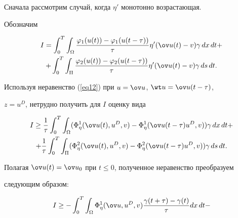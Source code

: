 \begin{pf}


Сначала рассмотрим случай, когда ${\eta}'$ монотонно возрастающая.


Обозначим 


\begin{multline*}


I=\int_{0}^{T} \int_{\Omega} \frac{\varphi_{1}(u(t))


- \varphi_{1}(u(t-\tau))}


{\tau}{\eta}' (\ov u(t)-v) \gamma\, dx\, dt+ \\


%


+\int_{0}^{T} \int_{\Pi} \frac{\varphi_{2}(u(t))-\varphi_{2}(u(t-\tau))}


{\tau}{\eta}' (\ov u(t)-v) \gamma\, ds\, dt.


\end{multline*}





Используя неравенство (\ref{eq12}) при $u = \ov u$, $\wt u=\ov u(t-\tau)$,


$z = u^{D}$, нетрудно получить для $I$ оценку вида


\begin{multline*}


I \geq \frac{1}{\tau} \int_{0}^{T} \int_{\Omega} 


(\Phi_{\eta}^{1} (\ov u(t), u^{D}, v) -


\Phi_{\eta}^{1} (\ov u(t-\tau) u^{D}, v)) \gamma\, dx\, dt+ \\


%


+\frac{1}{\tau} \int_{0}^{T} \int_{\Pi} 


(\Phi_{\eta}^{2} (\ov u(t), u^{D}, v) -


\Phi_{\eta}^{2} (\ov u(t-\tau) u^{D}, v)) \gamma\, ds\, dt.


\end{multline*}


Полагая $\ov u(t)=\ov u_{0}$ при $t\le0$, полученное неравенство преобразуем


следующим образом:


\begin{multline}


\label{eq14.0}


I \geq-\int_{0}^{T} \int_{\Omega} \Phi_{\eta}^{1} (\ov u, u^{D}, v)


\frac{\gamma (t+\tau)-\gamma (t)}{\tau} dx\, dt-



\end{multline}
\end{pf}
